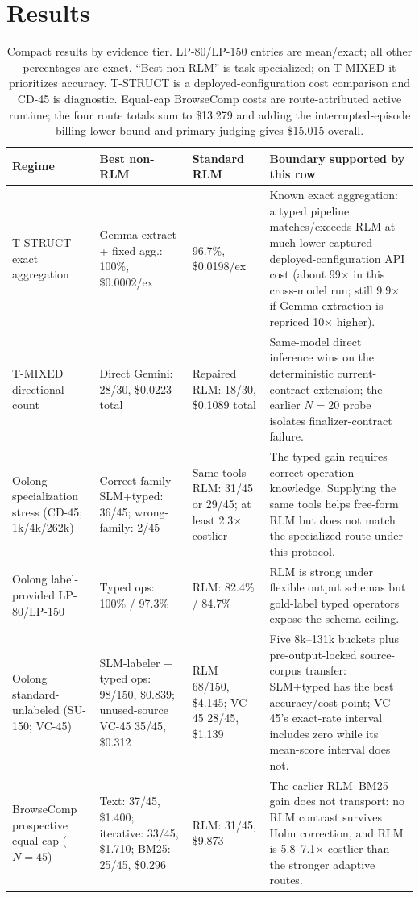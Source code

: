 \documentclass[letterpaper]{article}
\begin{document}
\section{Results}

\begin{table}[t]
\centering
\small
\setlength{\tabcolsep}{5pt}
\begin{tabular}{@{}L{2.9cm}L{3.7cm}L{3.2cm}L{6.8cm}@{}}
\toprule
\textbf{Regime} & \textbf{Best non-RLM} & \textbf{Standard RLM} & \textbf{Boundary supported by this row} \\
\midrule
T-STRUCT exact aggregation & Gemma extract + fixed agg.: 100\%, \$0.0002/ex & 96.7\%, \$0.0198/ex & Known exact aggregation: a typed pipeline matches/exceeds RLM at much lower captured deployed-configuration API cost (about 99$\times$ in this cross-model run; still 9.9$\times$ if Gemma extraction is repriced 10$\times$ higher). \\
\addlinespace[3pt]
T-MIXED directional count & Direct Gemini: 28/30, \$0.0223 total & Repaired RLM: 18/30, \$0.1089 total & Same-model direct inference wins on the deterministic current-contract extension; the earlier $N{=}20$ probe isolates finalizer-contract failure. \\
\addlinespace[3pt]
Oolong specialization stress (CD-45; 1k/4k/262k) & Correct-family SLM+typed: 36/45; wrong-family: 2/45 & Same-tools RLM: 31/45 or 29/45; at least 2.3$\times$ costlier & The typed gain requires correct operation knowledge. Supplying the same tools helps free-form RLM but does not match the specialized route under this protocol. \\
\addlinespace[3pt]
Oolong label-provided \mbox{LP-80/LP-150} & Typed ops: 100\% / 97.3\% & RLM: 82.4\% / 84.7\% & RLM is strong under flexible output schemas but gold-label typed operators expose the schema ceiling. \\
\addlinespace[3pt]
Oolong standard-unlabeled (SU-150; VC-45) & SLM-labeler + typed ops: 98/150, \$0.839; unused-source VC-45 35/45, \$0.312 & RLM 68/150, \$4.145; VC-45 28/45, \$1.139 & Five 8k--131k buckets plus pre-output-locked source-corpus transfer: SLM+typed has the best accuracy/cost point; VC-45's exact-rate interval includes zero while its mean-score interval does not. \\
\addlinespace[3pt]
BrowseComp prospective equal-cap ($N{=}45$) & Text: 37/45, \$1.400; iterative: 33/45, \$1.710; BM25: 25/45, \$0.296 & RLM: 31/45, \$9.873 & The earlier RLM--BM25 gain does not transport: no RLM contrast survives Holm correction, and RLM is 5.8--7.1$\times$ costlier than the stronger adaptive routes. \\
\bottomrule
\end{tabular}
\caption{Compact results by evidence tier. LP-80/LP-150 entries are mean/exact; all other percentages are exact. ``Best non-RLM'' is task-specialized; on T-MIXED it prioritizes accuracy. T-STRUCT is a deployed-configuration cost comparison and CD-45 is diagnostic. Equal-cap BrowseComp costs are route-attributed active runtime; the four route totals sum to \$13.279 and adding the interrupted-episode billing lower bound and primary judging gives \$15.015 overall.}
\label{tab:compact-main}
\end{table}
\end{document}
